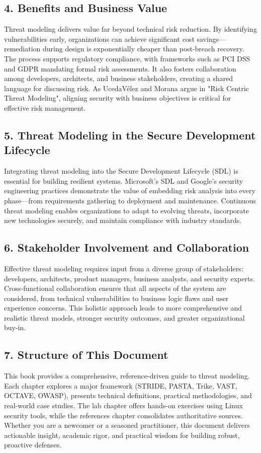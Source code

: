 \subsection*{4. Benefits and Business Value}
Threat modeling delivers value far beyond technical risk reduction. By identifying vulnerabilities early, organizations can achieve significant cost savings—remediation during design is exponentially cheaper than post-breach recovery. The process supports regulatory compliance, with frameworks such as PCI DSS and GDPR mandating formal risk assessments. It also fosters collaboration among developers, architects, and business stakeholders, creating a shared language for discussing risk. As UcedaVélez and Morana argue in "Risk Centric Threat Modeling"\cite{uceda2015}, aligning security with business objectives is critical for effective risk management.

\subsection*{5. Threat Modeling in the Secure Development Lifecycle}
Integrating threat modeling into the Secure Development Lifecycle (SDL) is essential for building resilient systems. Microsoft’s SDL and Google’s security engineering practices demonstrate the value of embedding risk analysis into every phase—from requirements gathering to deployment and maintenance. Continuous threat modeling enables organizations to adapt to evolving threats, incorporate new technologies securely, and maintain compliance with industry standards.

\subsection*{6. Stakeholder Involvement and Collaboration}
Effective threat modeling requires input from a diverse group of stakeholders: developers, architects, product managers, business analysts, and security experts. Cross-functional collaboration ensures that all aspects of the system are considered, from technical vulnerabilities to business logic flaws and user experience concerns. This holistic approach leads to more comprehensive and realistic threat models, stronger security outcomes, and greater organizational buy-in.

\subsection*{7. Structure of This Document}
This book provides a comprehensive, reference-driven guide to threat modeling. Each chapter explores a major framework (STRIDE, PASTA, Trike, VAST, OCTAVE, OWASP), presents technical definitions, practical methodologies, and real-world case studies. The lab chapter offers hands-on exercises using Linux security tools, while the references chapter consolidates authoritative sources. Whether you are a newcomer or a seasoned practitioner, this document delivers actionable insight, academic rigor, and practical wisdom for building robust, proactive defenses.

